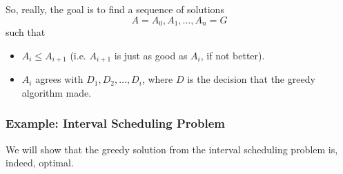\documentclass[letterpaper]{article}
\begin{document}
\bigskip 

So, really, the goal is to find a sequence of solutions
\[A = A_0, A_1, \dots, A_n = G\]
such that 
\begin{itemize}
    \item $A_i \leq A_{i + 1}$ (i.e. $A_{i + 1}$ is just as good as $A_i$, if not better).
    \item $A_i$ agrees with $D_1, D_2, \dots, D_i$, where $D$ is the decision that the greedy algorithm made. 
\end{itemize}

\subsubsection{Example: Interval Scheduling Problem}
We will show that the greedy solution from the interval scheduling problem is, indeed, optimal. 
\end{document}

